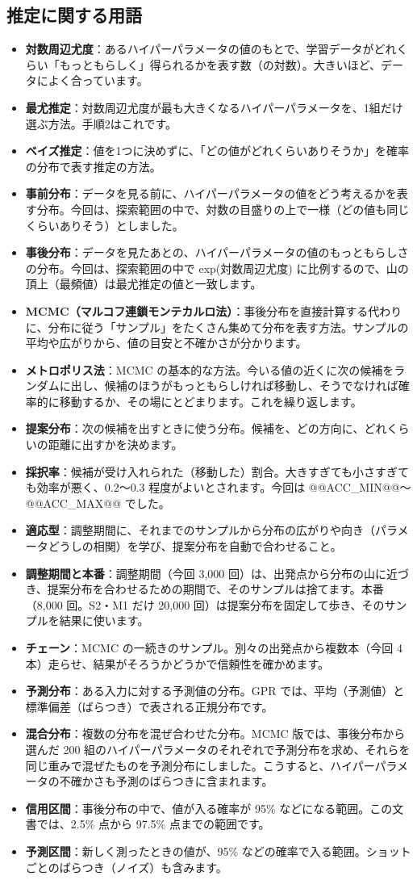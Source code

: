 \documentclass[paper=a4paper,fontsize=10.5pt,line_length=44zw,number_of_lines=38]{jlreq}
\newenvironment{termlist}{\begin{itemize}[label=・,leftmargin=1\zw,labelwidth=1\zw,labelsep=0pt,itemsep=0.4ex,topsep=0.6ex,parsep=0pt]}{\end{itemize}}
\newcommand{\term}[1]{\item \textbf{#1}：}
\begin{document}
\subsection{推定に関する用語}
\begin{termlist}
\term{対数周辺尤度}あるハイパーパラメータの値のもとで、学習データがどれくらい「もっともらしく」得られるかを表す数（の対数）。大きいほど、データによく合っています。
\term{最尤推定}対数周辺尤度が最も大きくなるハイパーパラメータを、1組だけ選ぶ方法。手順2はこれです。
\term{ベイズ推定}値を1つに決めずに、「どの値がどれくらいありそうか」を確率の分布で表す推定の方法。
\term{事前分布}データを見る前に、ハイパーパラメータの値をどう考えるかを表す分布。今回は、探索範囲の中で、対数の目盛りの上で一様（どの値も同じくらいありそう）としました。
\term{事後分布}データを見たあとの、ハイパーパラメータの値のもっともらしさの分布。今回は、探索範囲の中で exp(対数周辺尤度) に比例するので、山の頂上（最頻値）は最尤推定の値と一致します。
\term{MCMC（マルコフ連鎖モンテカルロ法）}事後分布を直接計算する代わりに、分布に従う「サンプル」をたくさん集めて分布を表す方法。サンプルの平均や広がりから、値の目安と不確かさが分かります。
\term{メトロポリス法}MCMC の基本的な方法。今いる値の近くに次の候補をランダムに出し、候補のほうがもっともらしければ移動し、そうでなければ確率的に移動するか、その場にとどまります。これを繰り返します。
\term{提案分布}次の候補を出すときに使う分布。候補を、どの方向に、どれくらいの距離に出すかを決めます。
\term{採択率}候補が受け入れられた（移動した）割合。大きすぎても小さすぎても効率が悪く、0.2〜0.3 程度がよいとされます。今回は @@ACC_MIN@@〜@@ACC_MAX@@ でした。
\term{適応型}調整期間に、それまでのサンプルから分布の広がりや向き（パラメータどうしの相関）を学び、提案分布を自動で合わせること。
\term{調整期間と本番}調整期間（今回 3,000 回）は、出発点から分布の山に近づき、提案分布を合わせるための期間で、そのサンプルは捨てます。本番（8,000 回。S2・M1 だけ 20,000 回）は提案分布を固定して歩き、そのサンプルを結果に使います。
\term{チェーン}MCMC の一続きのサンプル。別々の出発点から複数本（今回 4 本）走らせ、結果がそろうかどうかで信頼性を確かめます。
\term{予測分布}ある入力に対する予測値の分布。GPR では、平均（予測値）と標準偏差（ばらつき）で表される正規分布です。
\term{混合分布}複数の分布を混ぜ合わせた分布。MCMC 版では、事後分布から選んだ 200 組のハイパーパラメータのそれぞれで予測分布を求め、それらを同じ重みで混ぜたものを予測分布にしました。こうすると、ハイパーパラメータの不確かさも予測のばらつきに含まれます。
\term{信用区間}事後分布の中で、値が入る確率が 95\% などになる範囲。この文書では、2.5\% 点から 97.5\% 点までの範囲です。
\term{予測区間}新しく測ったときの値が、95\% などの確率で入る範囲。ショットごとのばらつき（ノイズ）も含みます。
\end{termlist}
\end{document}
